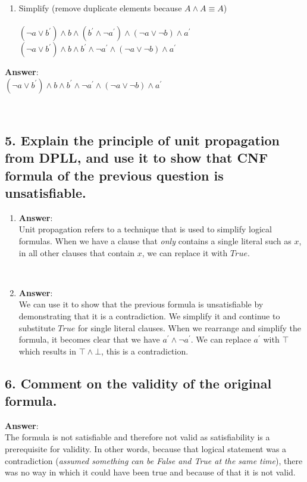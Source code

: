 \documentclass[a4paper, 14pt]{report}
\newcommand{\answer}[1]{%
	\begin{flushleft}
		\textbf{Answer}:\\
			#1
	\end{flushleft}}
\newcommand{\question}[1]{\subsection*{#1}}
\begin{document}
\begin{enumerate}
\begin{enumerate}
		\item Simplify (remove duplicate elements because $ A \wedge A \equiv A$) \\ \\ 
			$ (\neg a \vee b^\prime) \wedge b \wedge (b^\prime \wedge \neg a^\prime) \wedge (\neg a \vee \neg b) \wedge a^\prime  $ \\
			$ (\neg a \vee b^\prime) \wedge b \wedge b^\prime \wedge \neg a^\prime \wedge (\neg a \vee \neg b) \wedge a^\prime  $ \\

	\end{enumerate}		
\end{enumerate}		

\hline

\answer{$ (\neg a \vee b^\prime) \wedge b \wedge b^\prime \wedge \neg a^\prime \wedge (\neg a \vee \neg b) \wedge a^\prime  $ \\} \\

\question{5. Explain the principle of unit propagation from DPLL, and use
  it to show that CNF formula of the previous question is unsatisfiable.}

	\begin{enumerate}		

		\item \answer{%
				Unit propagation refers to a technique that is used to simplify
				logical formulas.
				When we have a clause that \textit{only} contains a single literal
				such as $ x $, in all other clauses that contain $ x $, we can
			  replace it with $ True $.} \\

		\item \answer{%
				We can use it to show that the previous formula is unsatisfiable by demonstrating that it is a contradiction.
				We simplify it and continue to substitute $ True $ for single literal clauses.
				When we rearrange and simplify the formula, it becomes clear that we have 
				$ a^\prime \wedge \neg a^\prime $.  We can replace $a^\prime$ with $\top$ which results in $\top \wedge \bot$, this is a contradiction.}

	\end{enumerate}		

\question{6. Comment on the validity of the original formula.} 

\answer{The formula is not satisfiable and therefore not valid as satisfiability is
	a prerequisite for validity. In other words, because that logical statement
	was a contradiction (\textit{assumed something can be False and True at the same time}), there was no way in which it could have been true and
	because of that it is not valid.}
\end{document}
